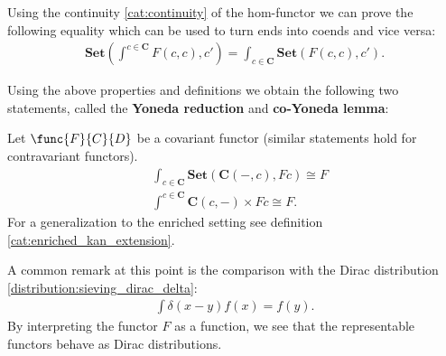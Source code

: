 
    \begin{property}
        Using the continuity \ref{cat:continuity} of the hom-functor we can prove the following equality which can be used to turn ends into coends and vice versa:
        \begin{gather}
            \mathbf{Set}\left(\int^{c\in\mathbf{C}}F(c, c), c'\right) = \int_{c\in\mathbf{C}}\mathbf{Set}\left(F(c, c), c'\right).
        \end{gather}
    \end{property}

    Using the above properties and definitions we obtain the following two statements, called the \textbf{Yoneda reduction} and \textbf{co-Yoneda lemma}:
    \begin{property}\label{cat:ninja_yoneda}
        Let $\func{F}{C}{D}$ be a covariant functor (similar statements hold for contravariant functors).
        \begin{align}
            &\int_{c\in\mathbf{C}}\mathbf{Set}\left(\mathbf{C}(-, c), Fc\right)\cong F\\
            &\int^{c\in\mathbf{C}}\mathbf{C}(c, -)\times Fc\cong F.
        \end{align}
        For a generalization to the enriched setting see definition \ref{cat:enriched_kan_extension}.
    \end{property}
    \begin{remark}
        A common remark at this point is the comparison with the Dirac distribution \ref{distribution:sieving_dirac_delta}:
        \begin{gather}
            \int \delta(x-y)f(x) = f(y).
        \end{gather}
        By interpreting the functor $F$ as a function, we see that the representable functors behave as Dirac distributions.
    \end{remark}


